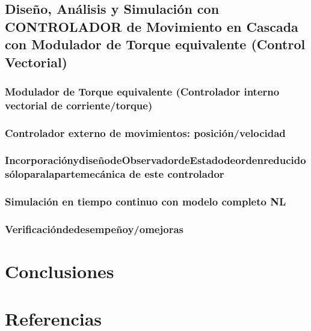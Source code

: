 \documentclass[10pt]{article}
\begin{document}
\subsection{Diseño, Análisis y Simulación con CONTROLADOR de Movimiento en Cascada con Modulador de Torque equivalente (Control Vectorial)}
\subsubsection{Modulador de Torque equivalente (Controlador interno vectorial de corriente/torque)}
\subsubsection{Controlador externo de movimientos: posición/velocidad }
\subsubsection{IncorporaciónydiseñodeObservadordeEstadodeordenreducidosóloparalapartemecánica de este controlador}
\subsubsection{Simulación en tiempo continuo con modelo completo NL}
\subsubsection{Verificacióndedesempeñoy/omejoras}

\section{Conclusiones}

\section{Referencias}
\end{document}
